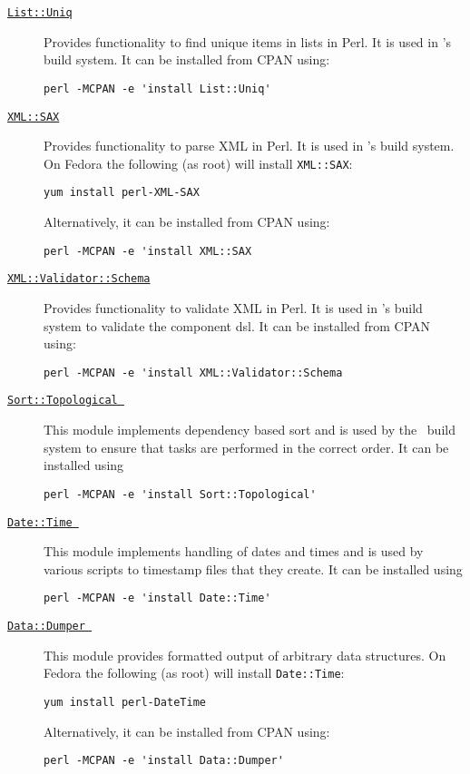 \begin{description}
\item [\href{http://search.cpan.org/~jfitz/List-Uniq-0.20/lib/List/Uniq.pm}{{\tt List::Uniq}}] Provides functionality to find unique items in lists in Perl. It is used in \glc's build system. It can be installed from CPAN using:
\begin{verbatim}
perl -MCPAN -e 'install List::Uniq'
\end{verbatim}

\item [\href{http://search.cpan.org/~grantm/XML-SAX-0.99/SAX.pm}{{\tt XML::SAX}}] Provides functionality to parse XML in Perl. It is used in \glc's build system. On Fedora the following (as root) will install {\tt XML::SAX}:
\begin{verbatim}
yum install perl-XML-SAX
\end{verbatim}
Alternatively, it can be installed from CPAN using:
\begin{verbatim}
perl -MCPAN -e 'install XML::SAX
\end{verbatim}

\item [\href{http://search.cpan.org/~samtregar/XML-Validator-Schema-1.08/Schema.pm}{{\tt XML::Validator::Schema}}] Provides functionality to validate XML in Perl. It is used in \glc's build system to validate the \gls{component} \gls{dsl}. It can be installed from CPAN using:
\begin{verbatim}
perl -MCPAN -e 'install XML::Validator::Schema
\end{verbatim}

\item [\href{http://search.cpan.org/~kstephens/Data-Match-0.06/lib/Sort/Topological.pm}{{\tt Sort::Topological }}] This module implements dependency based sort and is used by the \glc\ build system to ensure that tasks are performed in the correct order. It can be installed using
\begin{verbatim}
perl -MCPAN -e 'install Sort::Topological'
\end{verbatim}

\item [\href{http://search.cpan.org/~drolsky/DateTime-0.70/lib/DateTime.pm}{{\tt Date::Time }}] This module implements handling of dates and times and is used by various scripts to timestamp files that they create. It can be installed using
\begin{verbatim}
perl -MCPAN -e 'install Date::Time'
\end{verbatim}

\item [\href{http://search.cpan.org/~smueller/Data-Dumper-2.131/Dumper.pm}{{\tt Data::Dumper }}] This module provides formatted output of arbitrary data structures. On Fedora the following (as root) will install {\tt Date::Time}:
\begin{verbatim}
yum install perl-DateTime
\end{verbatim}
Alternatively, it can be installed from CPAN using:
\begin{verbatim}
perl -MCPAN -e 'install Data::Dumper'
\end{verbatim}
\end{description}

